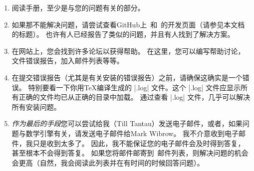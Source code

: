 \iffalse
\begin{enumerate}
    \item Read the manual, at least the part that has to do with your
        problem.
    \item If that does not solve the problem, try having a look at the GitHub development page for \pgfname\ and \tikzname\ (see the title of this document). Perhaps someone has already reported a similar problem and someone has found a solution.
    \item On the website you will find numerous forums for getting help. There, you can write to help forums, file bug reports, join mailing lists, and so on.
    \item Before you file a bug report, especially a bug report concerning the installation, make sure that this is really a bug. In particular, have a look at the |.log| file that results when you \TeX\ your files. This |.log| file should show that all the right files are loaded from the right directories. Nearly all installation problems can be resolved by looking at the |.log| file.
    \item \emph{As a last resort} you can try to email me (Till Tantau) or, if the problem concerns the mathematical engine, Mark Wibrow. I do not mind getting emails, I simply get way too many of them. Because of this, I cannot guarantee that your emails will be answered in a  timely fashion or even at all. Your chances that your problem will be fixed are somewhat higher if you mail to the \pgfname\ mailing list (naturally, I read this list and answer questions when I have the time).
\end{enumerate}
\fi

\begin{enumerate}
    \item 阅读手册，至少是与您的问题有关的部分。
    \item 如果那不能解决问题，请尝试查看GitHub上\pgfname\ 和\tikzname\ 的开发页面（请参见本文档的标题）。 也许有人已经报告了类似的问题，并且有人找到了解决方案。
    \item 在网站上，您会找到许多论坛以获得帮助。 在这里，您可以编写帮助讨论，文件错误报告，加入邮件列表等等。
    \item 在提交错误报告（尤其是有关安装的错误报告）之前，请确保这确实是一个错误。 特别要看一下你用\TeX 编译生成的 |.log| 文件。这个 |.log| 文件应显示所有正确的文件均已从正确的目录中加载。 通过查看 |.log| 文件，几乎可以解决所有安装问题。
    \item \emph{作为最后的手段}您可以尝试给我（Till Tantau）发送电子邮件，或者，如果问题与数学引擎有关，请发送电子邮件给Mark Wibrow。 我不介意收到电子邮件，我只是收到太多了。 因此，我不能保证您的电子邮件会及时得到答复，甚至根本不会得到答复。 如果您将邮件邮寄到\pgfname\ 邮件列表，则解决问题的机会会更高（自然，我会阅读此列表并在有时间的时候回答问题）。
\end{enumerate}

\clearpage